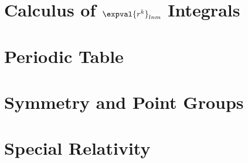\documentclass[a4paper, 11pt]{book}
\newcommand{\1}{\opr{\mathds{1}}}
\begin{document}
	\chapter{Calculus of $\expval{r^k}_{lnm}$ Integrals}
		
	\chapter{Periodic Table}\label{app:E}
		
%		
	\chapter{Symmetry and Point Groups}\label{app:groups}
		
	\chapter{Special Relativity}
		
		
		
\nocite{quantistica,landau3,statistica,struttura,struttura1,griffmq,sakuraimqm,patritesta,molekulphysik,complessa,griffpart,nucleare,relativitat,relativita,pdg,griffpart,thermoditt}
\printbibliography
\end{document}

